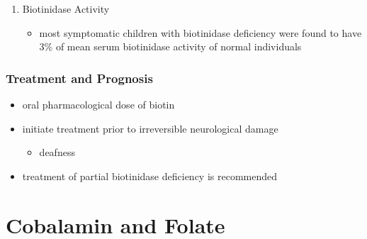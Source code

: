 \documentclass{scrartcl}
\begin{document}
\begin{enumerate}
\item Biotinidase Activity
\label{sec:org44dba64}
\begin{itemize}
\item most symptomatic children with biotinidase deficiency were found to
have 3\% of mean serum biotinidase activity of normal individuals
\end{itemize}
\end{enumerate}

\subsubsection{Treatment and Prognosis}
\label{sec:org00b700f}
\begin{itemize}
\item oral pharmacological dose of biotin
\item initiate treatment prior to irreversible neurological damage
\begin{itemize}
\item deafness
\end{itemize}
\item treatment of partial biotinidase deficiency is recommended
\end{itemize}

\section{Cobalamin and Folate}
\label{sec:org77852aa}
\end{document}
